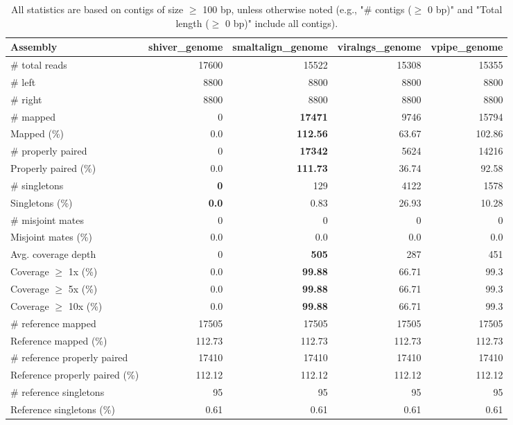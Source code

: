 \documentclass[12pt,a4paper]{article}
\begin{document}
\begin{table}[ht]
\begin{center}
\caption{All statistics are based on contigs of size $\geq$ 100 bp, unless otherwise noted (e.g., "\# contigs ($\geq$ 0 bp)" and "Total length ($\geq$ 0 bp)" include all contigs).}
\begin{tabular}{|l*{4}{|r}|}
\hline
Assembly & shiver\_genome & smaltalign\_genome & viralngs\_genome & vpipe\_genome \\ \hline
\# total reads & 17600 & 15522 & 15308 & 15355 \\ \hline
\# left & 8800 & 8800 & 8800 & 8800 \\ \hline
\# right & 8800 & 8800 & 8800 & 8800 \\ \hline
\# mapped & 0 & {\bf 17471} & 9746 & 15794 \\ \hline
Mapped (\%) & 0.0 & {\bf 112.56} & 63.67 & 102.86 \\ \hline
\# properly paired & 0 & {\bf 17342} & 5624 & 14216 \\ \hline
Properly paired (\%) & 0.0 & {\bf 111.73} & 36.74 & 92.58 \\ \hline
\# singletons & {\bf 0} & 129 & 4122 & 1578 \\ \hline
Singletons (\%) & {\bf 0.0} & 0.83 & 26.93 & 10.28 \\ \hline
\# misjoint mates & 0 & 0 & 0 & 0 \\ \hline
Misjoint mates (\%) & 0.0 & 0.0 & 0.0 & 0.0 \\ \hline
Avg. coverage depth & 0 & {\bf 505} & 287 & 451 \\ \hline
Coverage $\geq$ 1x (\%) & 0.0 & {\bf 99.88} & 66.71 & 99.3 \\ \hline
Coverage $\geq$ 5x (\%) & 0.0 & {\bf 99.88} & 66.71 & 99.3 \\ \hline
Coverage $\geq$ 10x (\%) & 0.0 & {\bf 99.88} & 66.71 & 99.3 \\ \hline
\# reference mapped & 17505 & 17505 & 17505 & 17505 \\ \hline
Reference mapped (\%) & 112.73 & 112.73 & 112.73 & 112.73 \\ \hline
\# reference properly paired & 17410 & 17410 & 17410 & 17410 \\ \hline
Reference properly paired (\%) & 112.12 & 112.12 & 112.12 & 112.12 \\ \hline
\# reference singletons & 95 & 95 & 95 & 95 \\ \hline
Reference singletons (\%) & 0.61 & 0.61 & 0.61 & 0.61 \\ \hline

\end{tabular}
\end{center}
\end{table}
\end{document}

